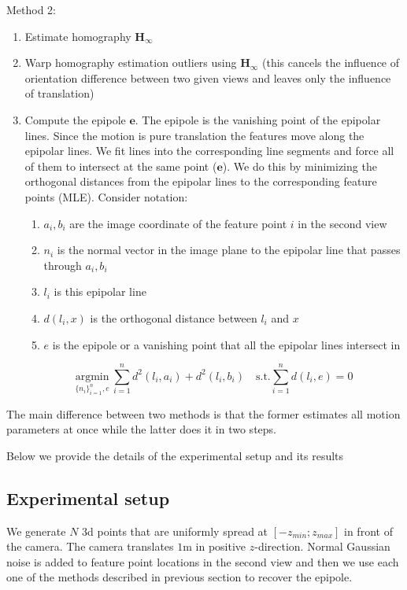\documentclass[10pt]{article}         %
\begin{document}
\item Method 2:
\begin{enumerate}
\item Estimate homography $\mathbf{H}_{\boldsymbol{\infty}}$
\item Warp homography estimation outliers using
  $\mathbf{H}_{\boldsymbol{\infty}}$ (this cancels the influence of
  orientation difference between two given views and leaves
  only the influence of translation)
\item Compute the epipole $\mathbf{e}$.  The epipole is the vanishing
  point of the epipolar lines. Since the motion is pure translation
  the features move along the epipolar lines. We fit lines into the
  corresponding line segments and force all of them to intersect at
  the same point ($\mathbf{e}$).  We do this by minimizing the
  orthogonal distances from the epipolar lines to the corresponding
  feature points (MLE). Consider notation:
  \begin{enumerate}
  \item $a_i, b_i$ are the image coordinate of the feature point $i$
    in the second view
  \item $n_i$ is the normal vector in the image plane to the epipolar
    line that passes through $a_i,b_i$ 
  \item $l_i$ is this epipolar line
  \item $d(l_i,x)$ is the orthogonal distance between $l_i$ and $x$
  \item $e$ is the epipole or a vanishing point that all the epipolar
    lines intersect in
\end{enumerate}
\[
\underset{\{n_i\}_{i=1}^n,e}{\text{argmin}}\ \sum_{i=1}^nd^2(l_i,a_i) + d^2(l_i,b_i)\quad\text{s.t.} \sum_{i=1}^nd(l_i,e)=0
\]
\end{enumerate}
The main difference between two methods is that the former estimates
all motion parameters at once while the latter does it in two steps.

Below we provide the details of the experimental setup and its results

\subsection{Experimental setup}

We generate $N$ 3d points that are uniformly spread at
$[-z_{min};z_{max}]$ in front of the camera.  The camera translates
$1$m in positive $z$-direction.  Normal Gaussian noise is added to
feature point locations in the second view and then we use each one of
the methods described in previous section to recover the epipole.
\end{document}
